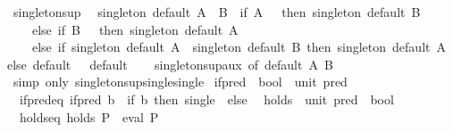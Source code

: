 \begin{isabellebody}
%
\endisatagproof
{\isafoldproof}%
%
\isadelimproof
\isanewline
%
\endisadelimproof
\isanewline
{}\isamarkupfalse%
\ singleton{\isacharunderscore}{\kern0pt}sup{\isacharcolon}{\kern0pt}\isanewline
\ \ {\isachardoublequoteopen}singleton\ default\ {\isacharparenleft}{\kern0pt}A\ {\isasymsqunion}\ B{\isacharparenright}{\kern0pt}\ {\isacharequal}{\kern0pt}\ {\isacharparenleft}{\kern0pt}if\ A\ {\isacharequal}{\kern0pt}\ {\isasymbottom}\ then\ singleton\ default\ B\isanewline
\ \ \ \ else\ if\ B\ {\isacharequal}{\kern0pt}\ {\isasymbottom}\ then\ singleton\ default\ A\isanewline
\ \ \ \ else\ if\ singleton\ default\ A\ {\isacharequal}{\kern0pt}\ singleton\ default\ B\ then\ singleton\ default\ A\ else\ default\ {\isacharparenleft}{\kern0pt}{\isacharparenright}{\kern0pt}{\isacharparenright}{\kern0pt}{\isachardoublequoteclose}\ \ default\isanewline
%
\isadelimproof
\ \ %
\endisadelimproof
%
\isatagproof
{}\isamarkupfalse%
\ singleton{\isacharunderscore}{\kern0pt}sup{\isacharunderscore}{\kern0pt}aux\ {\isacharbrackleft}{\kern0pt}of\ default\ A\ B{\isacharbrackright}{\kern0pt}\ \isamarkupfalse%
\ {\isacharparenleft}{\kern0pt}simp\ only{\isacharcolon}{\kern0pt}\ singleton{\isacharunderscore}{\kern0pt}sup{\isacharunderscore}{\kern0pt}single{\isacharunderscore}{\kern0pt}single{\isacharparenright}{\kern0pt}%
\endisatagproof
{\isafoldproof}%
%
\isadelimproof
%
\endisadelimproof
%
\isadelimdocument
%
\endisadelimdocument
%
\isatagdocument
%
\isamarkuptrue%
%
\endisatagdocument
{\isafolddocument}%
%
\isadelimdocument
%
\endisadelimdocument
{}\isamarkupfalse%
\ if{\isacharunderscore}{\kern0pt}pred\ {\isacharcolon}{\kern0pt}{\isacharcolon}{\kern0pt}\ {\isachardoublequoteopen}bool\ {\isasymRightarrow}\ unit\ pred{\isachardoublequoteclose}\ \isanewline
\ \ if{\isacharunderscore}{\kern0pt}pred{\isacharunderscore}{\kern0pt}eq{\isacharcolon}{\kern0pt}\ {\isachardoublequoteopen}if{\isacharunderscore}{\kern0pt}pred\ b\ {\isacharequal}{\kern0pt}\ {\isacharparenleft}{\kern0pt}if\ b\ then\ single\ {\isacharparenleft}{\kern0pt}{\isacharparenright}{\kern0pt}\ else\ {\isasymbottom}{\isacharparenright}{\kern0pt}{\isachardoublequoteclose}\isanewline
\isanewline
{}\isamarkupfalse%
\ holds\ {\isacharcolon}{\kern0pt}{\isacharcolon}{\kern0pt}\ {\isachardoublequoteopen}unit\ pred\ {\isasymRightarrow}\ bool{\isachardoublequoteclose}\ \isanewline
\ \ holds{\isacharunderscore}{\kern0pt}eq{\isacharcolon}{\kern0pt}\ {\isachardoublequoteopen}holds\ P\ {\isacharequal}{\kern0pt}\ eval\ P\ {\isacharparenleft}{\kern0pt}{\isacharparenright}{\kern0pt}{\isachardoublequoteclose}\isanewline

\end{isabellebody}
